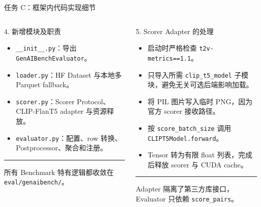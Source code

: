 \documentclass[aspectratio=169,10pt]{beamer}
\begin{document}
\begin{frame}{任务 C：框架内代码实现细节}
  \begin{columns}[T,onlytextwidth]
      \begin{block}{4. 新增模块及职责}
        \begin{minipage}[c][5.05cm][c]{\linewidth}
          \begin{itemize}\scriptsize
            \item \texttt{\_\_init\_\_.py}：导出 \texttt{GenAIBenchEvaluator}。
            \item \texttt{loader.py}：HF Dataset 与本地多 Parquet fallback。
            \item \texttt{scorer.py}：Scorer Protocol、CLIP-FlanT5 adapter 与资源释放。
            \item \texttt{evaluator.py}：配置、row 转换、Postprocessor、聚合和注册。
          \end{itemize}
          \vspace{0.45em}
          \color{T2IGray}\rule{\linewidth}{0.35pt}\par\vspace{0.3em}
          \scriptsize 所有 Benchmark 特有逻辑都收敛在 \texttt{eval/genaibench/}。
        \end{minipage}
      \end{block}

      \begin{block}{5. Scorer Adapter 的处理}
        \begin{minipage}[c][5.05cm][c]{\linewidth}
          \begin{itemize}\scriptsize
            \item 启动时严格检查 \texttt{t2v-metrics==1.1}。
            \item 只导入所需 \texttt{clip\_t5\_model} 子模块，避免无关可选后端影响加载。
            \item 将 PIL 图片写入临时 PNG，因为官方 scorer 接收路径。
            \item 按 \texttt{score\_batch\_size} 调用 \texttt{CLIPT5Model.forward}。
            \item Tensor 转为有限 float 列表，完成后释放 scorer 与 CUDA cache。
          \end{itemize}
          \vspace{0.45em}
          \color{T2IGray}\rule{\linewidth}{0.35pt}\par\vspace{0.3em}
          \scriptsize Adapter 隔离了第三方库接口，Evaluator 只依赖 \texttt{score\_pairs}。
        \end{minipage}
      \end{block}


\end{columns}
\end{frame}
\end{document}
